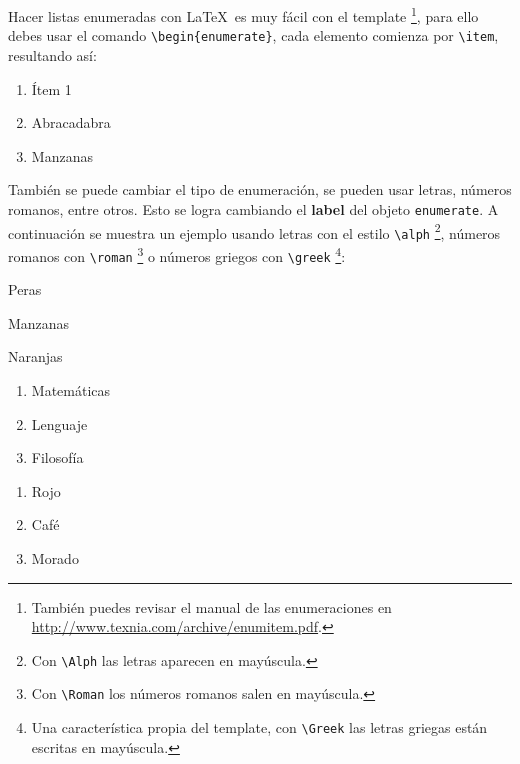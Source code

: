 	
		
		Hacer listas enumeradas con \LaTeX\ es muy fácil con el template \footnote{También puedes revisar el manual de las enumeraciones en \url{http://www.texnia.com/archive/enumitem.pdf}.}, para ello debes usar el comando \texttt{\textbackslash begin\{enumerate\}}, cada elemento comienza por \texttt{\textbackslash item}, resultando así:
		
		\begin{enumerate}
			\item Ítem 1
			\item Abracadabra
			\item Manzanas
		\end{enumerate}
		
		También se puede cambiar el tipo de enumeración, se pueden usar letras, números romanos, entre otros. Esto se logra cambiando el \textbf{label} del objeto \texttt{enumerate}. A continuación se muestra un ejemplo usando letras con el estilo \texttt{\textbackslash alph} \footnote{Con \texttt{\textbackslash Alph} las letras aparecen en mayúscula.}, números romanos con \texttt{\textbackslash roman} \footnote{Con \texttt{\textbackslash Roman} los números romanos salen en mayúscula.} o números griegos con \texttt{\textbackslash greek} \footnote{Una característica propia del template, con \texttt{\textbackslash Greek} las letras griegas están escritas en mayúscula.}:
		
		\begin{multicols}{3}
			\begin{enumeratebf}[label=\alph*) ] %
				\item Peras
				\item Manzanas
				\item Naranjas
			\end{enumeratebf}
			
			\begin{enumerate}[label=\greek*) ]
				\item Matemáticas
				\item Lenguaje
				\item Filosofía
			\end{enumerate}
		
			\begin{enumerate}[label=\roman*) ]
				\item Rojo
				\item Café
				\item Morado
			\end{enumerate}
		\end{multicols}
		
